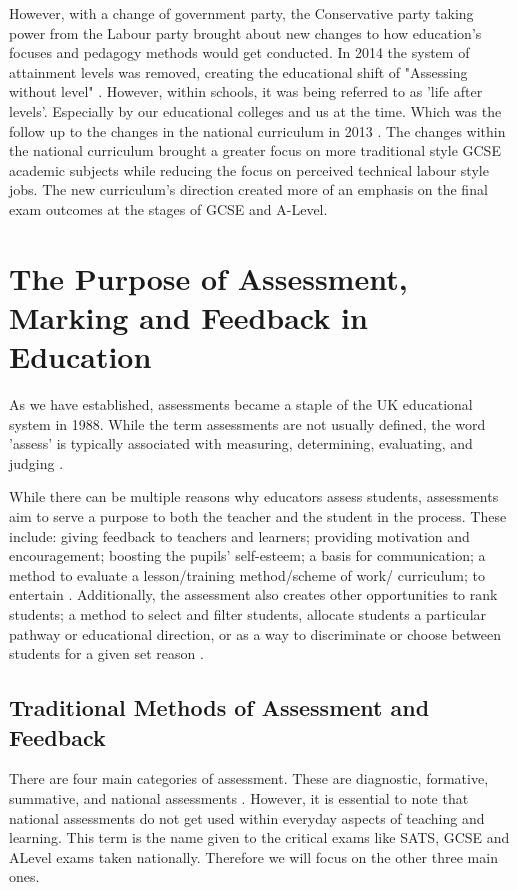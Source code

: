 	However, with a change of government party, the Conservative party taking power from the Labour party brought about new changes to how education's focuses and pedagogy methods would get conducted. In 2014 the system of attainment levels was removed, creating the educational shift of "Assessing without level" \cite{ass_without_lvls}. However, within schools, it was being referred to as 'life after levels'. Especially by our educational colleges and us at the time. Which was the follow up to the changes in the national curriculum in 2013 \cite{ass_without_lvls}. The changes within the national curriculum brought a greater focus on more traditional style GCSE academic subjects while reducing the focus on perceived technical labour style jobs. The new curriculum's direction created more of an emphasis on the final exam outcomes at the stages of GCSE and A-Level.
	
	\section{The Purpose of Assessment, Marking and Feedback in Education}
		As we have established, assessments became a staple of the UK educational system in 1988. While the term assessments are not usually defined, the word 'assess' is typically associated with measuring, determining, evaluating, and judging \cite{wellington2007secondary}.
		
		While there can be multiple reasons why educators assess students, assessments aim to serve a purpose to both the teacher and the student in the process. These include: giving feedback to teachers and learners; providing motivation and encouragement; boosting the pupils' self-esteem; a basis for communication; a method to evaluate a lesson/training method/scheme of work/ curriculum; to entertain \cite{wellington2007secondary}. Additionally, the assessment also creates other opportunities to rank students; a method to select and filter students, allocate students a particular pathway or educational direction, or as a way to discriminate or choose between students for a given set reason \cite{wellington2007secondary}.
	
	\subsection{Traditional Methods of Assessment and Feedback} %
		There are four main categories of assessment. These are diagnostic, formative, summative, and national assessments \cite{wellington2007secondary, dillon2011becoming}. However, it is essential to note that national assessments do not get used within everyday aspects of teaching and learning. This term is the name given to the critical exams like SATS, GCSE and ALevel exams taken nationally. Therefore we will focus on the other three main ones.
	
